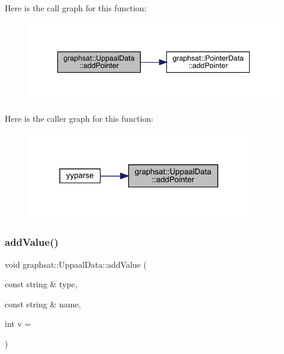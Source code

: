 Here is the call graph for this function\+:\nopagebreak
\begin{figure}[H]
\begin{center}
\leavevmode
\includegraphics[width=343pt]{classgraphsat_1_1_uppaal_data_a8da77b23b7dc06303c819748398a2e27_cgraph}
\end{center}
\end{figure}
Here is the caller graph for this function\+:\nopagebreak
\begin{figure}[H]
\begin{center}
\leavevmode
\includegraphics[width=280pt]{classgraphsat_1_1_uppaal_data_a8da77b23b7dc06303c819748398a2e27_icgraph}
\end{center}
\end{figure}
\mbox{\label{classgraphsat_1_1_uppaal_data_a50f0cab2fb2e5624b39068e49d4c51ee}} 
\subsubsection{\texorpdfstring{addValue()}{addValue()}}
{\footnotesize\ttfamily void graphsat\+::\+Uppaal\+Data\+::add\+Value (\begin{DoxyParamCaption}\item[{const string \&}]{type,  }\item[{const string \&}]{name,  }\item[{int}]{v = {} }\end{DoxyParamCaption})\hspace{0.3cm}{\ttfamily [inline]}}

